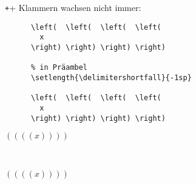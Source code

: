 \begin{frame}[fragile]{\texttt+\delimitershortfall+}
  Klammern wachsen nicht immer:
  \begin{CodeExample}{0.8}
    \begin{verbatim}
      \left(  \left(  \left(  \left(
        x
      \right) \right) \right) \right)

      % in Präambel
      \setlength{\delimitershortfall}{-1sp}

      \left(  \left(  \left(  \left(
        x
      \right) \right) \right) \right)
    \end{verbatim}
  \CodeResult
    \begin{CenterStrip}{3}
      $\left( \left( \left( \left( x \right) \right) \right) \right)$
    \end{CenterStrip}
    \\[4\baselineskip]
    \setlength{\delimitershortfall}{-1sp}
    \begin{CenterStrip}{3}
      $\left( \left( \left( \left( x \right) \right) \right) \right)$
    \end{CenterStrip}
  \end{CodeExample}
\end{frame}
